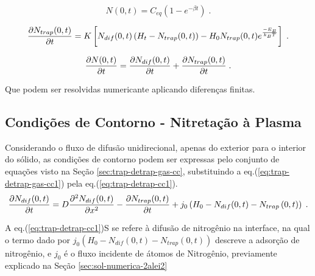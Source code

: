 \begin{equation}
\label{eq:trap-detrap-gas-cc1}
N(0,t) = C_{eq}(1 - e^{-\beta t}) \;.
\end{equation}

\begin{equation}
\label{eq:trap-detrap-gas-cc2}
\pdv{N_{trap}(0,t)}{t} = K\left[N_{dif}(0,t)\left(H_t-N_{trap}(0,t)\right) - H_0 N_{trap}(0,t)e^{\frac{-E_B}{k_BT}}\right]  \;.
\end{equation}

\begin{equation}
\label{eq:trap-detrap-gas-cc3}
\pdv{N(0,t)}{t} = \pdv{N_{dif}(0,t)}{t} + \pdv{N_{trap}(0,t)}{t} \;.
\end{equation}

Que podem ser resolvidas numericante aplicando diferenças finitas.

\subsection{Condições de Contorno - Nitretação à Plasma}
\label{sec:trap-detrap-plasma-cc}
Considerando o fluxo de difusão unidirecional, apenas do exterior para o interior do sólido, as condições de contorno podem ser expressas pelo conjunto de equações visto na Seção \ref{sec:trap-detrap-gas-cc}, substituindo a eq.(\ref{eq:trap-detrap-gas-cc1}) pela eq.(\ref{eq:trap-detrap-cc1}).
\begin{equation}
\label{eq:trap-detrap-cc1}
\pdv{N_{dif}(0,t)}{t} = D\pdv[2]{N_{dif}(0,t)}{x} - \pdv{N_{trap}(0,t)}{t}  + j_{0}\left(H_0-N_{dif}(0,t)-N_{trap}\left(0,t\right)\right) \;.
\end{equation}


A eq.(\ref{eq:trap-detrap-cc1})S se refere à difusão de nitrogênio na interface, na qual o termo dado por $j_{0}\left(H_0-N_{dif}(0,t)-N_{trap}\left(0,t\right)\right)$ descreve a adsorção de nitrogênio, e  $j_0$ é o fluxo incidente de átomos de Nitrogênio, previamente explicado na Seção \autoref{sec:sol-numerica-2alei2}

